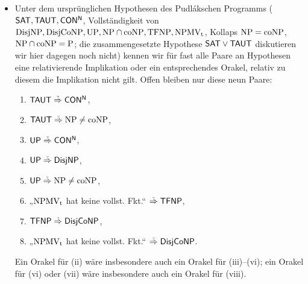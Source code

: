 \begin{itemize}[parsep=0pt,listparindent=\parindent,itemsep=5pt plus 1pt minus 1pt,midpenalty=0]
    \item Unter dem ursprünglichen Hypothesen des Pudlákschen Programms ($\mathsf{SAT}, \mathsf{TAUT}, \mathsf{CON^N}$, Vollständigkeit von $\mathrm{DisjNP}, \mathrm{DisjCoNP}, \mathrm{UP}, \mathrm{NP}\cap\mathrm{coNP}, \mathrm{TFNP}, \mathrm{NPMV_t}$, Kollaps $\mathrm{NP}=\mathrm{coNP}$, $\mathrm{NP}\cap\mathrm{coNP}=\mathrm{P}$; die zusammengesetzte Hypothese $\mathsf{SAT}\lor\mathsf{TAUT}$ diskutieren wir hier dagegen noch nicht) kennen wir für fast alle Paare an Hypothesen eine relativierende Implikation oder ein entsprechendes Orakel, relativ zu diesem die Implikation nicht gilt. Offen bleiben nur diese neun Paare:
        \begin{enumerate}[noitemsep,midpenalty=0,label=(\roman*)]
            \item $\hTAUT\stackrel{\smash{\text{\raisebox{-1pt}{\tiny ?}}}}{\Rightarrow}\mathsf{CON^N}$,
            \item $\hTAUT\stackrel{\smash{\text{\raisebox{-1pt}{\tiny ?}}}}{\Rightarrow}\NP\neq\coNP$,
            \item $\hUP\stackrel{\smash{\text{\raisebox{-1pt}{\tiny ?}}}}{\Rightarrow}\mathsf{CON^N}$,
            \item $\hUP\stackrel{\smash{\text{\raisebox{-1pt}{\tiny ?}}}}{\Rightarrow}\hDisjNP$,
            \item $\hUP\stackrel{\smash{\text{\raisebox{-1pt}{\tiny ?}}}}{\Rightarrow}\NP\neq\coNP$,
            \item „$\mathrm{NPMV_t}$ hat keine vollst. Fkt.“ $\stackrel{\smash{\text{\raisebox{-1pt}{\tiny ?}}}}{\Rightarrow} \hTFNP$,
            \item $\hTFNP\stackrel{\smash{\text{\raisebox{-1pt}{\tiny ?}}}}{\Rightarrow} \hDisjCoNP$,
            \item „$\mathrm{NPMV_t}$ hat keine vollst. Fkt.“ $\stackrel{\smash{\text{\raisebox{-1pt}{\tiny ?}}}}{\Rightarrow} \hDisjCoNP$.

        \end{enumerate}
        Ein Orakel für (ii) wäre insbesondere auch ein Orakel für (iii)--(vi); ein Orakel für (vi) oder (vii) wäre insbesondere auch ein Orakel für (viii).
        

\end{itemize}
